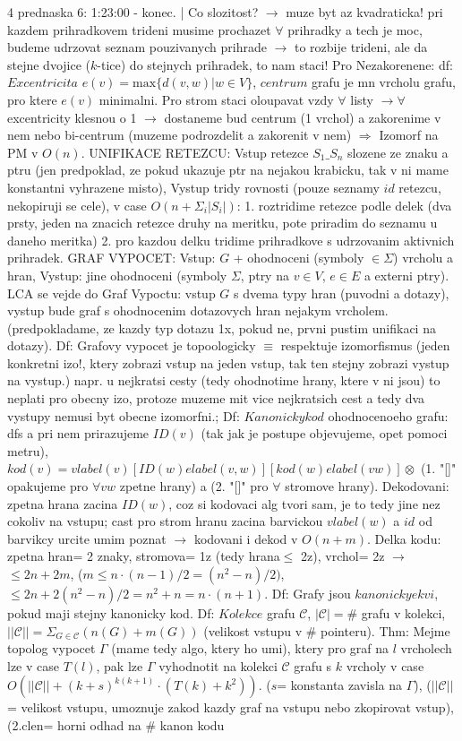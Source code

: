 \documentclass[8pt]{extarticle}
\begin{document}
\begin{multicols*}{4}
prednaska 6: 1:23:00 - konec. | Co slozitost? $\rightarrow$ muze byt az kvadraticka! pri kazdem prihradkovem trideni musime prochazet $\forall$ prihradky a tech je moc, budeme udrzovat seznam pouzivanych prihrade $\rightarrow$ to rozbije trideni, ale da stejne dvojice ($k$-tice) do stejnych prihradek, to nam staci! Pro Nezakorenene: df: $Excentricita$ $e(v) = \text{max}\{d(v,w)|w\in V\}$, $centrum$ grafu je mn vrcholu grafu, pro ktere $e(v)$ minimalni. Pro strom staci oloupavat vzdy $\forall$ listy $\rightarrow \forall$ excentricity klesnou o 1 $\rightarrow$ dostaneme bud centrum (1 vrchol) a zakorenime v nem nebo bi-centrum (muzeme podrozdelit a zakorenit v nem) $\Rightarrow$ Izomorf na PM v $O(n)$. UNIFIKACE RETEZCU: Vstup retezce $S_1\_S_n$ slozene ze znaku a ptru (jen predpoklad, ze pokud ukazuje ptr na nejakou krabicku, tak v ni mame konstantni vyhrazene misto), Vystup tridy rovnosti (pouze seznamy $id$ retezcu, nekopiruji se cele), v case $O(n + \Sigma_i |S_i|)$: 1. roztridime retezce podle delek (dva prsty, jeden na znacich retezce druhy na meritku, pote priradim do seznamu u daneho meritka) 2. pro kazdou delku tridime prihradkove s udrzovanim aktivnich prihradek. GRAF VYPOCET: Vstup: $G$ + ohodnoceni (symboly $\in \Sigma$) vrcholu a hran, Vystup: jine ohodnoceni (symboly $\Sigma$, ptry na $v\in V$, $e\in E$ a externi ptry). LCA se vejde do Graf Vypoctu: vstup $G$ s dvema typy hran (puvodni a dotazy), vystup bude graf s ohodnocenim dotazovych hran nejakym vrcholem. (predpokladame, ze kazdy typ dotazu 1x, pokud ne, prvni pustim unifikaci na dotazy). Df: Grafovy vypocet je topoologicky $\equiv$ respektuje izomorfismus (jeden konkretni izo!, ktery zobrazi vstup na jeden vstup, tak ten stejny zobrazi vystup na vystup.) napr. u nejkratsi cesty (tedy ohodnotime hrany, ktere v ni jsou) to neplati pro obecny izo, protoze muzeme mit vice nejkratsich cest a tedy dva vystupy nemusi byt obecne izomorfni.; Df: $Kanonicky kod$ ohodnocenoeho grafu: dfs a pri nem prirazujeme $ID(v)$ (tak jak je postupe objevujeme, opet pomoci metru), $kod(v) = vlabel(v)[ID(w)elabel(v,w)][kod(w)elabel(vw)]\otimes$ (1. "[]" opakujeme pro $\forall vw$ zpetne hrany) a (2. "[]" pro $\forall$ stromove hrany). Dekodovani: zpetna hrana zacina $ID(w)$, coz si kodovaci alg tvori sam, je to tedy jine nez cokoliv na vstupu; cast pro strom hranu zacina barvickou $vlabel(w)$ a $id$ od barvikcy urcite umim poznat $\rightarrow$ kodovani i dekod v $O(n+m)$. Delka kodu: zpetna hran= 2 znaky, stromova= 1z (tedy hrana$\leq$ 2z), vrchol= 2z $\rightarrow$ $\leq 2n + 2m$, ($m \leq n\cdot(n-1)/2 = (n^2-n)/2)$, $\leq 2n + 2(n^2-n)/2 = n^2 + n = n\cdot(n+1)$. Df: Grafy jsou $kanonicky ekvi$, pokud maji stejny kanonicky kod. Df: $Kolekce$ grafu $\mathcal{C}$, $|\mathcal{C}| =$\# grafu v kolekci, $||\mathcal{C}||= \Sigma_{G\in\mathcal{C}}(n(G) + m(G))$ (velikost vstupu v \# pointeru). Thm: Mejme topolog vypocet $\Gamma$ (mame tedy algo, ktery ho umi), ktery pro graf na $l$ vrcholech lze v case $T(l)$, pak lze $\Gamma$ vyhodnotit na kolekci $\mathcal{C}$ grafu s $k$ vrcholy v case $O(||\mathcal{C}|| + (k+s)^{k(k+1)}\cdot (T(k) + k^2))$. ($s$= konstanta zavisla na $\Gamma$), ($||\mathcal{C}||$= velikost vstupu, umoznuje zakod kazdy graf na vstupu nebo zkopirovat vstup), (2.clen= horni odhad na \# kanon kodu 
\end{multicols*}
\end{document}
